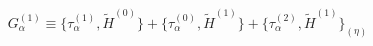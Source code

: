 \begin{equation}
  G_\alpha ^{(1)}\equiv\{\tau_\alpha ^{(1)}, \tilde{H}^{(0)}\}+ \{\tau_\alpha ^{(0)},
  \tilde{H}^{(1)}\}+\{\tau_\alpha ^{(2)}, \tilde{H}^{(1)}\}_{(\eta)}
  \label{a20}
  \end{equation}

